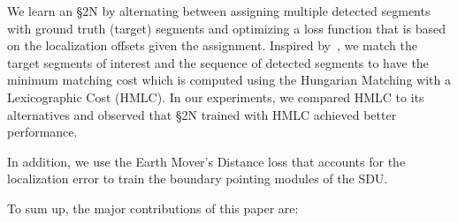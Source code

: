 \documentclass[10pt,journal,compsoc]{IEEEtran}
\begin{document}

%
%
%

We learn an \S2N by alternating between assigning multiple detected segments with ground truth (target) segments and optimizing a loss function that is based on the localization offsets given the assignment. Inspired by~\cite{stewart2016end,graves2006connectionist}, we match the target segments of interest and the sequence of detected segments to have the minimum matching cost which is computed using the Hungarian Matching with a Lexicographic Cost (HMLC). In our experiments, we compared HMLC to its alternatives and observed that \S2N trained with HMLC achieved better performance. 


In addition, we use the Earth Mover's Distance loss that accounts for the localization error to train the boundary pointing modules of the SDU.

To sum up, the major contributions of this paper are: 
\end{document}
